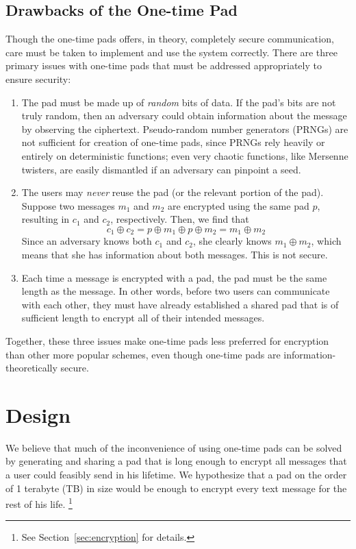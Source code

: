 \documentclass[twocolumn]{article}
\begin{document}
\subsection{Drawbacks of the One-time Pad}
Though the one-time pads offers, in theory, completely secure communication, care must be taken to implement and use the system correctly. There are three primary issues with one-time pads that must be addressed appropriately to ensure security:
\begin{enumerate}
\item The pad must be made up of \emph{random} bits of data. If the pad's bits are not truly random, then an adversary could obtain information about the message by observing the ciphertext. Pseudo-random number generators (PRNGs) are not sufficient for creation of one-time pads, since PRNGs rely heavily or entirely on deterministic functions; even very chaotic functions, like Mersenne twisters, are easily dismantled if an adversary can pinpoint a seed.
\item The users may \emph{never} reuse the pad (or the relevant portion of the pad). Suppose two messages $m_{1}$ and $m_{2}$ are encrypted using the same pad $p$, resulting in $c_1$ and $c_2$, respectively. Then, we find that
\[
c_{1} \oplus c_{2} = p \oplus m_{1} \oplus p \oplus m_{2}
= m_1 \oplus m_2
\]
Since an adversary knows both $c_1$ and $c_2$, she clearly knows $m_1 \oplus m_2$, which means that she has information about both messages. This is not secure.
\item Each time a message is encrypted with a pad, the pad must be the same length as the message. In other words, before two users can communicate with each other, they must have already established a shared pad that is of sufficient length to encrypt all of their intended messages.
\end{enumerate}
Together, these three issues make one-time pads less preferred for encryption than other more popular schemes, even though one-time pads are information-theoretically secure.

\section{Design}
We believe that much of the inconvenience of using one-time pads can be solved by generating and sharing a pad that is long enough to encrypt all messages that a user could feasibly send in his lifetime. We hypothesize that a pad on the order of 1 terabyte (TB) in size would be enough to encrypt every text message for the rest of his life. \footnote{
See Section~\ref{sec:encryption} for details.
}
\end{document}
